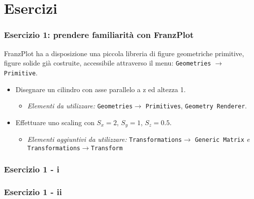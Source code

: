 \documentclass{beamer}
\newcommand{\fig}{figures}
\newcommand{\frnzplt}{FranzPlot }
\begin{document}
\section{Esercizi}
\begin{frame}
\frametitle{Esercizio 1: prendere familiarit\`a con \frnzplt}
\frnzplt ha a disposizione una piccola libreria di figure geometriche primitive, figure solide gi\`a costruite, accessibile attraverso il menu: \texttt{Geometries} $\rightarrow$\texttt{Primitive}.
\begin{itemize}
\item Disegnare un cilindro con asse parallelo a z ed altezza 1.
\begin{itemize}
\item \textit{Elementi da utilizzare:} \texttt{Geometries}$\rightarrow$ \texttt{Primitives}, \texttt{Geometry Renderer}.
\end{itemize}
\item Effettuare uno scaling con $S_x =2$, $S_y=1$, $S_z=0.5$.
\begin{itemize}
\item \textit{Elementi aggiuntivi da utilizzare:} \texttt{Transformations}$\rightarrow$ \texttt{Generic Matrix} \textit{e} \texttt{Transformations}$\rightarrow$\texttt{Transform}
\end{itemize}
\end{itemize}
\end{frame}
\begin{frame}
\frametitle{Esercizio 1 - i}
\begin{center}
\end{center}
\end{frame}
\begin{frame}
\frametitle{Esercizio 1 - ii}
\begin{center}
\end{center}
\end{frame}
\end{document}

